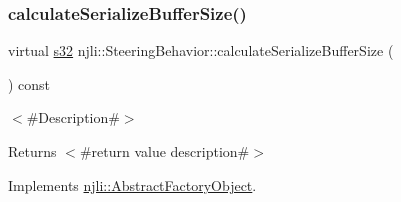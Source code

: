 \mbox{\label{classnjli_1_1_steering_behavior_abbc461d853c1b225cfde5b79d96d11bd}} 
\subsubsection{\texorpdfstring{calculate\+Serialize\+Buffer\+Size()}{calculateSerializeBufferSize()}}
{\footnotesize\ttfamily virtual \mbox{\hyperlink{_util_8h_aa62c75d314a0d1f37f79c4b73b2292e2}{s32}} njli\+::\+Steering\+Behavior\+::calculate\+Serialize\+Buffer\+Size (\begin{DoxyParamCaption}{ }\end{DoxyParamCaption}) const\hspace{0.3cm}{\ttfamily [virtual]}}

$<$\#\+Description\#$>$

\begin{DoxyReturn}{Returns}
$<$\#return value description\#$>$ 
\end{DoxyReturn}


Implements \mbox{\hyperlink{classnjli_1_1_abstract_factory_object_a4763d05bc9dc37c559111f8bb30e1dd8}{njli\+::\+Abstract\+Factory\+Object}}.



